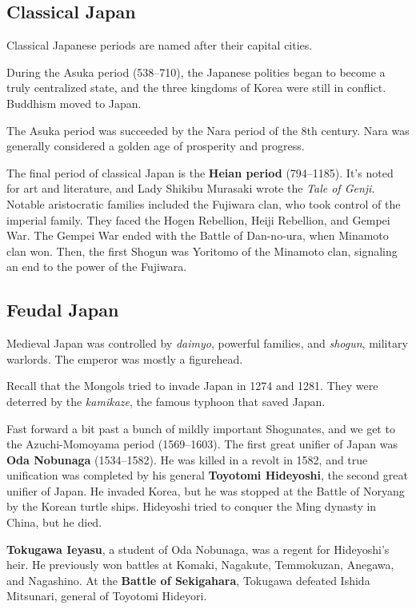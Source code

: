 \subsection*{Classical Japan}

Classical Japanese periods are named after their capital cities.

During the Asuka period (538--710), the Japanese polities began to become a truly centralized state,
and the three kingdoms of Korea were still in conflict.
Buddhism moved to Japan.

The Asuka period was succeeded by the Nara period of the 8th century.
Nara was generally considered a golden age of prosperity and progress.

The final period of classical Japan is the \textbf{Heian period} (794--1185).
It's noted for art and literature, and Lady Shikibu Murasaki wrote the \textit{Tale of Genji}.
Notable aristocratic families included the Fujiwara clan, who took control of the imperial family.
They faced the Hogen Rebellion, Heiji Rebellion, and Gempei War.
The Gempei War ended with the Battle of Dan-no-ura, when Minamoto clan won.
Then, the first Shogun was Yoritomo of the Minamoto clan, signaling an end to the power of the Fujiwara.

\subsection*{Feudal Japan}

Medieval Japan was controlled by \textit{daimyo}, powerful families, and \textit{shogun}, military warlords.
The emperor was mostly a figurehead.

Recall that the Mongols tried to invade Japan in 1274 and 1281.
They were deterred by the \textit{kamikaze}, the famous typhoon that saved Japan.

Fast forward a bit past a bunch of mildly important Shogunates,
and we get to the Azuchi-Momoyama period (1569--1603).
The first great unifier of Japan was \textbf{Oda Nobunaga} (1534--1582).
He was killed in a revolt in 1582,
and true unification was completed by his general \textbf{Toyotomi Hideyoshi},
the second great unifier of Japan.
He invaded Korea, but he was stopped at the Battle of Noryang by the Korean turtle ships.
Hideyoshi tried to conquer the Ming dynasty in China, but he died.

\textbf{Tokugawa Ieyasu}, a student of Oda Nobunaga, was a regent for Hideyoshi's heir.
He previously won battles at Komaki, Nagakute, Temmokuzan, Anegawa, and Nagashino.
At the \textbf{Battle of Sekigahara}, Tokugawa defeated Ishida Mitsunari, general of Toyotomi Hideyori.

